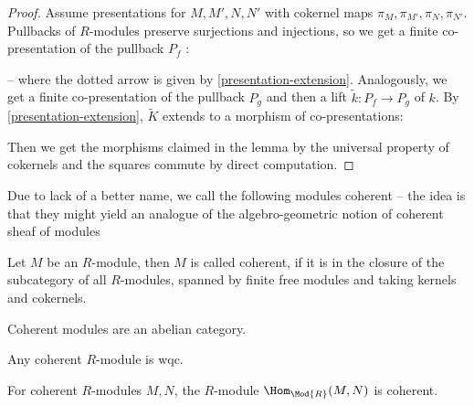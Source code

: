 \begin{proof}
  Assume presentations for $M,M',N,N'$ with cokernel maps $\pi_M,\pi_{M'},\pi_N,\pi_{N'}$.
  Pullbacks of $R$-modules preserve surjections and injections, so we get a finite co-presentation of the pullback $P_f$ :
  \begin{center}
  \end{center}
  -- where the dotted arrow is given by \cref{presentation-extension}.
  Analogously, we get a finite co-presentation of the pullback $P_g$ and then a lift $\tilde{k}:P_f\to P_g$ of $k$.
  By \cref{presentation-extension}, $\tilde{K}$ extends to a morphism of co-presentations:
  \begin{center}
  \end{center}
  Then we get the morphisms claimed in the lemma by the universal property of cokernels and the squares commute by direct computation.
\end{proof}

Due to lack of a better name, we call the following modules coherent --
the idea is that they might yield an analogue of the algebro-geometric notion of coherent sheaf of modules

\begin{definition}
  Let $M$ be an $R$-module, then $M$ is called coherent, if it is in the closure of the subcategory of all $R$-modules, spanned by finite free modules and taking kernels and cokernels.
\end{definition}

\begin{theorem}
  Coherent modules are an abelian category.
\end{theorem}

\begin{remark}
  Any coherent $R$-module is wqc.
\end{remark}

\begin{remark}
  \label{hom-closure}
  For coherent $R$-modules $M,N$, the $R$-module $\Hom_{\Mod{R}}(M,N)$ is coherent.
\end{remark}

